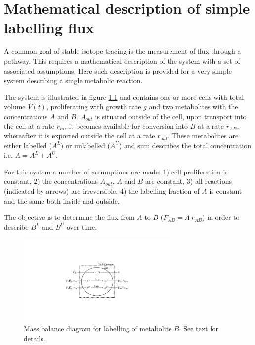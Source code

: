 \chapter{Mathematical description of simple labelling flux}
\label{chap1_app}
A common goal of stable isotope tracing is the measurement of flux through a pathway.
This requires a mathematical description of the system with a set of associated assumptions.
Here such description is provided for a very simple system describing a single metabolic reaction.

The system is illustrated in figure \ref{fig:app_ch1:tracing_diagram} and contains one or more cells with total volume $V(t)$, proliferating with growth rate $g$ and two metabolites with the concentrations $A$ and $B$.
$A_{out}$ is situated outside of the cell, upon transport into the cell at a rate $r_{in}$, it becomes available for conversion into $B$ at a rate $r_{AB}$, whereafter it is exported outside the cell at a rate $r_{out}$.
These metabolites are either labelled ($A^L$) or unlabelled ($A^U$) and sum describes the total concentration i.e. $A = A^L + A^U$.

For this system a number of assumptions are made:
1) cell proliferation is constant,
2) the concentrations $A_{out}$, $A$ and $B$ are constant,
3) all reactions (indicated by arrows) are irreversible,
4) the labelling fraction of $A$ is constant and the same both inside and outside.

The objective is to determine the flux from $A$ to $B$ ($F_{AB} = A\ r_{AB}$) in order to describe $B^L$ and $B^U$ over time.

\begin{figure}[ht]
    \centering
    \includegraphics[width=0.7\textwidth]{figures/chap1/app/tracing_diagram.pdf}
    \caption[Mass balance diagram for metabolite labelling]{
    Mass balance diagram for labelling of metabolite $B$.
    See text for details.
    }
    \label{fig:app_ch1:tracing_diagram}
\end{figure}


